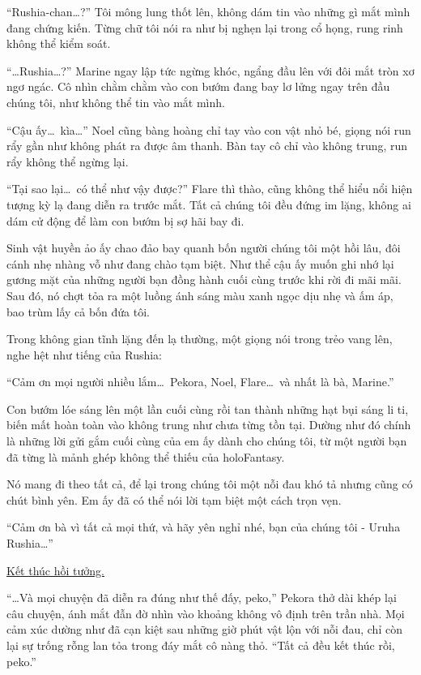 \documentclass[../main.tex]{subfiles}
\begin{document}
``Rushia-chan\dots?'' Tôi mông lung thốt lên, không dám tin vào những gì mắt mình đang chứng kiến. Từng chữ tôi nói ra như bị nghẹn lại trong cổ họng, rung rinh không thể kiểm soát.

``\dots Rushia\dots?'' Marine ngay lập tức ngừng khóc, ngẩng đầu lên với đôi mắt tròn xơ ngơ ngác. Cô nhìn chằm chằm vào con bướm đang bay lơ lửng ngay trên đầu chúng tôi, như không thể tin vào mắt mình.

``Cậu ấy\dots\ kìa\dots'' Noel cũng bàng hoàng chỉ tay vào con vật nhỏ bé, giọng nói run rẩy gần như không phát ra được âm thanh. Bàn tay cô chỉ vào không trung, run rẩy không thể ngừng lại.

``Tại sao lại\dots\ có thể như vậy được?'' Flare thì thào, cũng không thể hiểu nổi hiện tượng kỳ lạ đang diễn ra trước mắt. Tất cả chúng tôi đều đứng im lặng, không ai dám cử động để làm con bướm bị sợ hãi bay đi.

Sinh vật huyền ảo ấy chao đảo bay quanh bốn người chúng tôi một hồi lâu, đôi cánh nhẹ nhàng vỗ như đang chào tạm biệt. Như thể cậu ấy muốn ghi nhớ lại gương mặt của những người bạn đồng hành cuối cùng trước khi rời đi mãi mãi. Sau đó, nó chợt tỏa ra một luồng ánh sáng màu xanh ngọc dịu nhẹ và ấm áp, bao trùm lấy cả bốn đứa tôi.

Trong không gian tĩnh lặng đến lạ thường, một giọng nói trong trẻo vang lên, nghe hệt như tiếng của Rushia:

``Cảm ơn mọi người nhiều lắm\dots\ Pekora, Noel, Flare\dots\ và nhất là bà, Marine.''

Con bướm lóe sáng lên một lần cuối cùng rồi tan thành những hạt bụi sáng li ti, biến mất hoàn toàn vào không trung như chưa từng tồn tại. Dường như đó chính là những lời gửi gắm cuối cùng của em ấy dành cho chúng tôi, từ một người bạn đã từng là mảnh ghép không thể thiếu của holoFantasy.

Nó mang đi theo tất cả, để lại trong chúng tôi một nỗi đau khó tả nhưng cũng có chút bình yên. Em ấy đã có thể nói lời tạm biệt một cách trọn vẹn.

``Cảm ơn bà vì tất cả mọi thứ, và hãy yên nghỉ nhé, bạn của chúng tôi - Uruha Rushia\dots''

\begin{center}
    \uline{Kết thúc hồi tưởng.}
\end{center}

``\dots Và mọi chuyện đã diễn ra đúng như thế đấy, peko,'' Pekora thở dài khép lại câu chuyện, ánh mắt đẫn đờ nhìn vào khoảng không vô định trên trần nhà. Mọi cảm xúc dường như đã cạn kiệt sau những giờ phút vật lộn với nỗi đau, chỉ còn lại sự trống rỗng lan tỏa trong đáy mắt cô nàng thỏ. ``Tất cả đều kết thúc rồi, peko.''
\end{document}
